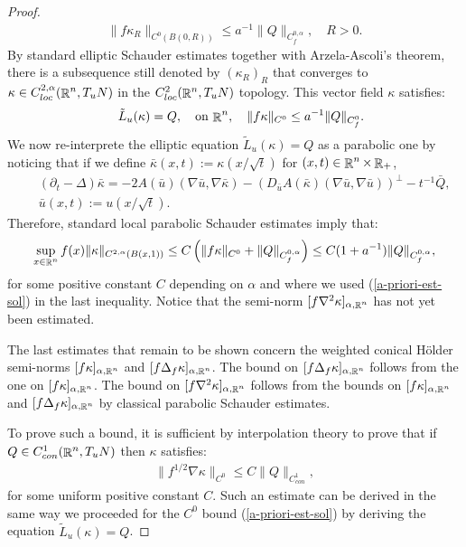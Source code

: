 \documentclass[a4paper,11pt,reqno]{amsart}
\def\R{\mathop{\rm \mathbb{R}}\nolimits}
\begin{document}
\begin{proof}
\begin{eqnarray*}
\|f\kappa_R\|_{C^0(B(0,R))}\leq a^{-1}\|Q\|_{C^{0,\alpha}_f},\quad R>0.
\end{eqnarray*}
By standard elliptic Schauder estimates together with Arzela-Ascoli's theorem, there is a subsequence still denoted by $(\kappa_R)_R$ that converges to $\kappa\in C^{2,\alpha}_{loc}(\R^n,T_uN)$ in the $C^2_{loc}(\R^n,T_uN)$ topology. This vector field $\kappa$ satisfies:
\begin{eqnarray}
&&\tilde{L}_u(\kappa)=Q,\quad \text{on $\R^n$},\quad \|f\kappa\|_{C^0}\leq a^{-1}\|Q\|_{C^{0}_f}.\label{a-priori-est-sol}
\end{eqnarray}
We now re-interprete the elliptic equation $\tilde{L}_u(\kappa)=Q$ as a parabolic one by noticing that if we define $\bar{\kappa}(x,t):=\kappa(x/\sqrt{t})$ for $(x,t)\in \R^n\times \R_+$, 
\begin{eqnarray*}
&&(\partial_t-\Delta )\bar{\kappa}=-2A(\bar{u})(\nabla \bar{u},\nabla\bar{\kappa})-\left(D_{\bar{u}}A(\bar{\kappa})(\nabla \bar{u},\nabla \bar{u})\right)^{\perp}-t^{-1}\bar{Q},\\
&&\bar{u}(x,t):=u(x/\sqrt{t}).
\end{eqnarray*}
Therefore, standard local parabolic Schauder estimates imply that:
\begin{eqnarray}
\sup_{x\in\R^n}f(x)\|\kappa\|_{C^{2,\alpha}(B(x,1))}\leq C\left( \|f\kappa\|_{C^0}+\|Q\|_{C^{0,\alpha}_f}\right)\leq C(1+a^{-1}) \|Q\|_{C^{0,\alpha}_f},\label{final-est}
\end{eqnarray}
for some positive constant $C$ depending on $\alpha$ and where we used (\ref{a-priori-est-sol}) in the last inequality. Notice that the semi-norm $[f\nabla^2\kappa]_{\alpha,\R^n}$ has not yet been estimated.

The last estimates that remain to be shown concern the weighted conical H\" older semi-norms $[f\kappa]_{\alpha,\R^n}$ and $[f\Delta_f\kappa]_{\alpha,\R^n}$. The bound on $[f\Delta_f\kappa]_{\alpha,\R^n}$ follows from the one on $[f\kappa]_{\alpha,\R^n}$. The bound on $[f\nabla^2\kappa]_{\alpha,\R^n}$ follows from the bounds on $[f\kappa]_{\alpha,\R^n}$ and $[f\Delta_f\kappa]_{\alpha,\R^n}$ by classical parabolic Schauder estimates.

  To prove such a bound, it is sufficient by interpolation theory to prove that if $Q\in C^1_{con}(\R^n,T_uN)$ then $\kappa$ satisfies:
\begin{eqnarray*}
\|f^{1/2}\nabla \kappa\|_{C^0}\leq C\|Q\|_{C^1_{con}},
\end{eqnarray*}
for some uniform positive constant $C$. Such an estimate can be derived in the same way we proceeded for the $C^0$ bound (\ref{a-priori-est-sol}) by deriving the equation $\tilde{L}_u(\kappa)=Q$.


\end{proof}
\end{document}

